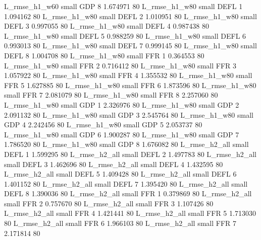  L_rmse_h1_w60      small      GDP                 8 1.674971 80
 L_rmse_h1_w80      small     DEFL                 1 1.094162 80
 L_rmse_h1_w80      small     DEFL                 2 1.010951 80
 L_rmse_h1_w80      small     DEFL                 3 0.997055 80
 L_rmse_h1_w80      small     DEFL                 4 0.987438 80
 L_rmse_h1_w80      small     DEFL                 5 0.988259 80
 L_rmse_h1_w80      small     DEFL                 6 0.993013 80
 L_rmse_h1_w80      small     DEFL                 7 0.999145 80
 L_rmse_h1_w80      small     DEFL                 8 1.004708 80
 L_rmse_h1_w80      small      FFR                 1 0.364553 80
 L_rmse_h1_w80      small      FFR                 2 0.716412 80
 L_rmse_h1_w80      small      FFR                 3 1.057922 80
 L_rmse_h1_w80      small      FFR                 4 1.355532 80
 L_rmse_h1_w80      small      FFR                 5 1.627885 80
 L_rmse_h1_w80      small      FFR                 6 1.873596 80
 L_rmse_h1_w80      small      FFR                 7 2.081079 80
 L_rmse_h1_w80      small      FFR                 8 2.257060 80
 L_rmse_h1_w80      small      GDP                 1 2.326976 80
 L_rmse_h1_w80      small      GDP                 2 2.091132 80
 L_rmse_h1_w80      small      GDP                 3 2.545764 80
 L_rmse_h1_w80      small      GDP                 4 2.242456 80
 L_rmse_h1_w80      small      GDP                 5 2.053737 80
 L_rmse_h1_w80      small      GDP                 6 1.900287 80
 L_rmse_h1_w80      small      GDP                 7 1.786520 80
 L_rmse_h1_w80      small      GDP                 8 1.676082 80
 L_rmse_h2_all      small     DEFL                 1 1.599295 80
 L_rmse_h2_all      small     DEFL                 2 1.497783 80
 L_rmse_h2_all      small     DEFL                 3 1.462696 80
 L_rmse_h2_all      small     DEFL                 4 1.432595 80
 L_rmse_h2_all      small     DEFL                 5 1.409428 80
 L_rmse_h2_all      small     DEFL                 6 1.401152 80
 L_rmse_h2_all      small     DEFL                 7 1.395420 80
 L_rmse_h2_all      small     DEFL                 8 1.390036 80
 L_rmse_h2_all      small      FFR                 1 0.379869 80
 L_rmse_h2_all      small      FFR                 2 0.757670 80
 L_rmse_h2_all      small      FFR                 3 1.107426 80
 L_rmse_h2_all      small      FFR                 4 1.421441 80
 L_rmse_h2_all      small      FFR                 5 1.713030 80
 L_rmse_h2_all      small      FFR                 6 1.966103 80
 L_rmse_h2_all      small      FFR                 7 2.171814 80
